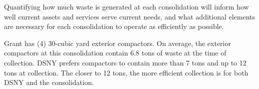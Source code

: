 
    Quantifying how much waste is generated at each consolidation will inform how well current assets and services serve current needs, and what additional elements are necessary for each consolidation to operate as efficiently as possible.
    
    Grant has (4) 30-cubic yard exterior compactors. On average, the exterior compactors at this consolidation contain 6.8 tons of waste at the time of collection. DSNY prefers compactors to contain more than 7 tons and up to 12 tons at collection. The closer to 12 tons, the more efficient collection is for both DSNY and the consolidation.